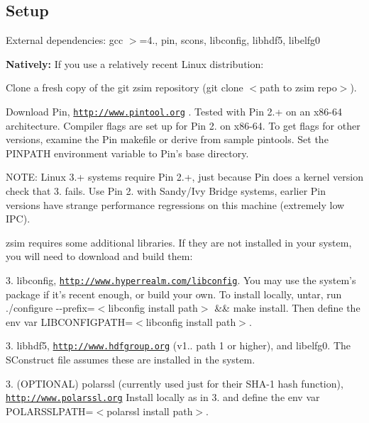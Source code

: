\subsection*{Setup }

External dependencies\-: {\ttfamily gcc $>$=4., pin, scons, libconfig, libhdf5, libelfg0}

{\bfseries Natively\-:} If you use a relatively recent Linux distribution\-:


\begin{DoxyEnumerate}
\item Clone a fresh copy of the git zsim repository ({\ttfamily git clone $<$path to zsim repo$>$}).
\item Download Pin, \href{http://www.pintool.org}{\tt http\-://www.\-pintool.\-org} . Tested with Pin 2.+ on an x86-\/64 architecture. Compiler flags are set up for Pin 2. on x86-\/64. To get flags for other versions, examine the Pin makefile or derive from sample pintools. Set the P\-I\-N\-P\-A\-T\-H environment variable to Pin's base directory.

N\-O\-T\-E\-: Linux 3.+ systems require Pin 2.+, just because Pin does a kernel version check that 3. fails. Use Pin 2. with Sandy/\-Ivy Bridge systems, earlier Pin versions have strange performance regressions on this machine (extremely low I\-P\-C).
\item zsim requires some additional libraries. If they are not installed in your system, you will need to download and build them\-:

3. libconfig, \href{http://www.hyperrealm.com/libconfig}{\tt http\-://www.\-hyperrealm.\-com/libconfig}. You may use the system's package if it's recent enough, or build your own. To install locally, untar, run {\ttfamily ./configure -\/-\/prefix=$<$libconfig install path$>$ \&\& make install}. Then define the env var {\ttfamily L\-I\-B\-C\-O\-N\-F\-I\-G\-P\-A\-T\-H=$<$libconfig install path$>$}.

3. libhdf5, \href{http://www.hdfgroup.org}{\tt http\-://www.\-hdfgroup.\-org} (v1.. path 1 or higher), and libelfg0. The S\-Construct file assumes these are installed in the system.

3. (O\-P\-T\-I\-O\-N\-A\-L) polarssl (currently used just for their S\-H\-A-\/1 hash function), \href{http://www.polarssl.org}{\tt http\-://www.\-polarssl.\-org} Install locally as in 3. and define the env var {\ttfamily P\-O\-L\-A\-R\-S\-S\-L\-P\-A\-T\-H=$<$polarssl install path$>$}.


\end{DoxyEnumerate}
